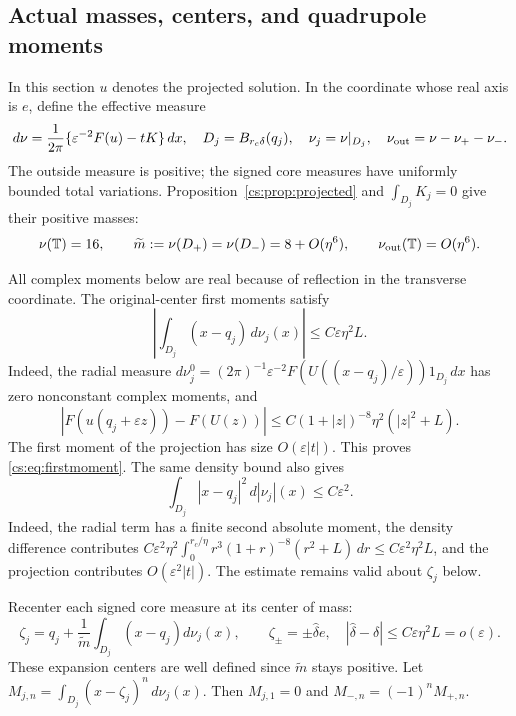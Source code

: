 \documentclass[11pt,reqno]{amsart}
\numberwithin{equation}{section}
\theoremstyle{definition}
\theoremstyle{remark}
\newcommand{\T}{\mathbb T}
\newcommand{\eps}{\varepsilon}
\newcommand{\dd}{\,dx}
\begin{document}
\subsection{Actual masses, centers, and quadrupole moments}\label{cs:sec:moments}

In this section $u$ denotes the projected solution.
In the coordinate whose real axis is $e$, define the effective measure
\begin{equation}\label{cs:eq:nu}
 d\nu=\frac1{2\pi}\{\eps^{-2}F(u)-tK\}\dd,\quad
 D_j=B_{r_c\delta}(q_j),\quad \nu_j=\nu|_{D_j},\quad
 \nu_{\rm out}=\nu-\nu_+-\nu_-.
\end{equation}
The outside measure is positive; the signed core measures have
uniformly bounded total variations. Proposition~\ref{cs:prop:projected}
and $\int_{D_j}K_j=0$ give their positive masses:
\begin{equation}\label{cs:eq:actual-mass}
 \nu(\T)=16,\qquad
 \widetilde m:=\nu(D_+)=\nu(D_-)=8+O(\eta^6),\qquad
 \nu_{\rm out}(\T)=O(\eta^6).
\end{equation}

All complex moments below are real because of reflection in the
transverse coordinate. The original-center first moments satisfy
\begin{equation}\label{cs:eq:firstmoment}
 \left|\int_{D_j}(x-q_j)\,d\nu_j(x)\right|\le C\eps\eta^2L.
\end{equation}
Indeed, the radial measure
\(d\nu_j^0=(2\pi)^{-1}\eps^{-2} F(U((x-q_j)/\eps))1_{D_j}\dd\)
has zero nonconstant complex moments, and
\begin{equation}\label{cs:eq:density-difference}
 |F(u(q_j+\eps z))-F(U(z))|
       \le C(1+|z|)^{-8}\eta^2(|z|^2+L).
\end{equation}
The first moment of the projection has size $O(\eps|t|)$.
This proves \eqref{cs:eq:firstmoment}.
The same density bound also gives
\begin{equation}\label{cs:eq:second-absolute-moment}
 \int_{D_j}|x-q_j|^2\,d|\nu_j|(x)\le C\eps^2.
\end{equation}
Indeed, the radial term has a finite second absolute moment,
the density difference contributes
$C\eps^2\eta^2\int_0^{r_c/\eta}r^3(1+r)^{-8}(r^2+L)\,dr
\le C\eps^2\eta^2L$, and the projection contributes
$O(\eps^2|t|)$. The estimate remains valid about $\zeta_j$ below.

Recenter each signed core measure at its center of mass:
\begin{equation}\label{cs:eq:centers}
 \zeta_j=q_j+\frac1{\widetilde m}\int_{D_j}(x-q_j)d\nu_j(x),\qquad
 \zeta_\pm=\pm\widehat\delta e,\quad
 |\widehat\delta-\delta|\le C\eps\eta^2L=o(\eps).
\end{equation}
These expansion centers are well defined since $\widetilde m$ stays positive. Let
\(M_{j,n}=\int_{D_j}(x-\zeta_j)^n\,d\nu_j(x).\)
Then $M_{j,1}=0$ and $M_{-,n}=(-1)^nM_{+,n}$.
\end{document}
